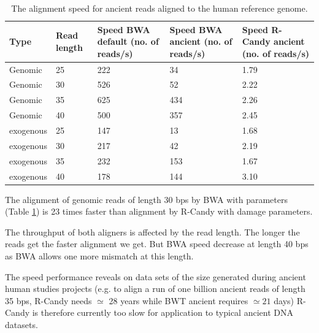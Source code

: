 \documentclass[11pt,a4paper]{report}
\begin{document}
\begin{table}[H]
  \begin{tabular}{ |  p{2cm} | p{2cm} | p{2cm} | p{2cm} |p{2cm} | }
    \hline
  	\textbf{Type} & \textbf{Read length }&\textbf{Speed BWA  
  		default (no. of reads/s) }
  	&\textbf{Speed BWA ancient (no. of reads/s)} 
  	& \textbf{Speed R-Candy ancient (no. of reads/s)}\\ \hline
 	  Genomic    & 25  & 222 &  34   &  1.79 \\ \hline
      Genomic    & 30  & 526 &  52   &  2.22 \\ \hline
      Genomic    & 35  & 625 &  434   &  2.26 \\ \hline
 	  Genomic	 & 40  & 500 &  357   &  2.45 \\ \hline
 	  exogenous  & 25  & 147 &  13   &  1.68 \\ \hline
      exogenous  & 30  & 217 &  42   &  2.19 \\ \hline
 	  exogenous  & 35  & 232 &  153   &  1.67 \\ \hline
 	  exogenous  & 40  & 178 &  144   &  3.10 \\ \hline
   \end{tabular}
\caption{The alignment speed for ancient reads aligned to 
the human reference genome.}
\label{speed-RG}
\end{table}



The alignment of genomic reads of length 30 bps by BWA with 
parameters (Table \ref{speed-RG}) is 23 times faster than alignment by R-Candy
with damage parameters.  

The throughput of both aligners is affected by the read length. The longer the
reads get the faster alignment we get. But BWA speed decrease at length 40 bps 
as BWA allows one more mismatch at this length.

The speed performance reveals on data sets of the size generated during ancient 
human studies projects (e.g. to align a run of one billion ancient reads of length
35 bps, R-Candy needs $\simeq $ 28 years while BWT ancient requires $\simeq 21$
days) R-Candy is therefore currently too slow for application to typical ancient 
DNA datasets.
\end{document}
